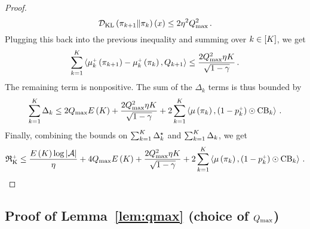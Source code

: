 \begin{proof}
    \begin{equation*}
        \mathcal{D}_{\text{KL}} \left( \pi_{k+1} \middle\| \pi_k \right) \left( x \right) \leq 2 \eta^2 Q_{\max}^2\,.
    \end{equation*}
    Plugging this back into the previous inequality and summing over $k \in \left[ K \right]$, we get
    \begin{equation*}
        \sum_{k=1}^K \left\langle \mu_k^{\mathsf{\scriptscriptstyle +}} \left( \pi_{k+1} \right) - \mu_k^{\mathsf{\scriptscriptstyle +}} \left( \pi_k \right), Q_{k+1} \right\rangle \leq \frac{2 Q_{\max}^2 \eta K}{\sqrt{1 - \gamma}}\,.
    \end{equation*}
    The remaining term is nonpositive. The sum of the $\Delta_k$ terms is thus bounded by
    \begin{equation*}
        \sum_{k=1}^K \Delta_k \leq 2 Q_{\max} E \left( K \right) + \frac{2 Q_{\max}^2 \eta K}{\sqrt{1 - \gamma}} + 2 \sum_{k=1}^K \left\langle \mu \left( \pi_k \right), \left( 1 - p_k^{\mathsf{\scriptscriptstyle +}} \right) \odot \operatorname{CB}_k \right\rangle\,.
    \end{equation*}
    Finally, combining the bounds on $\sum_{k=1}^K \Delta_k^\star$ and $\sum_{k=1}^K \Delta_k$, we get
    \begin{equation*}
        \operatorname{\mathfrak{R}_K^\mathsf{\scriptscriptstyle +}} \leq \frac{E \left( K \right) \log \left|\mathcal{A}\right|}{\eta} + 4 Q_{\max} E \left( K \right) + \frac{2 Q_{\max}^2 \eta K}{\sqrt{1 - \gamma}} + 2 \sum_{k=1}^K \left\langle \mu \left( \pi_k \right), \left( 1 - p_k^{\mathsf{\scriptscriptstyle +}} \right) \odot \operatorname{CB}_k \right\rangle\,.
    \end{equation*}
\end{proof}


\subsection{Proof of Lemma~\ref{lem:qmax} (choice of $Q_{\max}$)}
\label{app:qmax}

\qmaxlemma*

